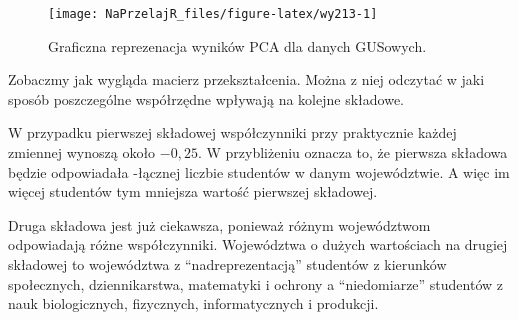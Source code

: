\documentclass[polish,]{book}
\newenvironment{Shaded}{\begin{snugshade}}{\end{snugshade}}
\newcommand{\CommentTok}[1]{\textcolor[rgb]{0.56,0.35,0.01}{\textit{#1}}}
\newcommand{\DecValTok}[1]{\textcolor[rgb]{0.00,0.00,0.81}{#1}}
\newcommand{\NormalTok}[1]{#1}
\newcommand{\OperatorTok}[1]{\textcolor[rgb]{0.81,0.36,0.00}{\textbf{#1}}}
\begin{document}
\begin{figure}[h]

{\centering \texttt{[image: NaPrzelajR\_files/figure-latex/wy213-1]} 

}

\caption{Graficzna reprezenacja wyników PCA dla danych GUSowych.}\label{fig:wy213}
\end{figure}

Zobaczmy jak wygląda macierz przekształcenia. Można z niej odczytać w jaki
sposób poszczególne współrzędne wpływają na kolejne składowe.

W przypadku pierwszej składowej współczynniki przy praktycznie każdej zmiennej wynoszą około \(-0,25\). W przybliżeniu oznacza to, że pierwsza składowa będzie
odpowiadała -łącznej liczbie studentów w danym województwie. A więc im więcej
studentów tym mniejsza wartość pierwszej składowej.

Druga składowa jest już ciekawsza, ponieważ różnym województwom odpowiadają różne współczynniki. Województwa o dużych wartościach na drugiej składowej
to województwa z ``nadreprezentacją'' studentów z kierunków społecznych, dziennikarstwa, matematyki i ochrony a ``niedomiarze'' studentów z nauk biologicznych, fizycznych, informatycznych i produkcji.

\begin{Shaded}
\end{Shaded}
\end{document}
